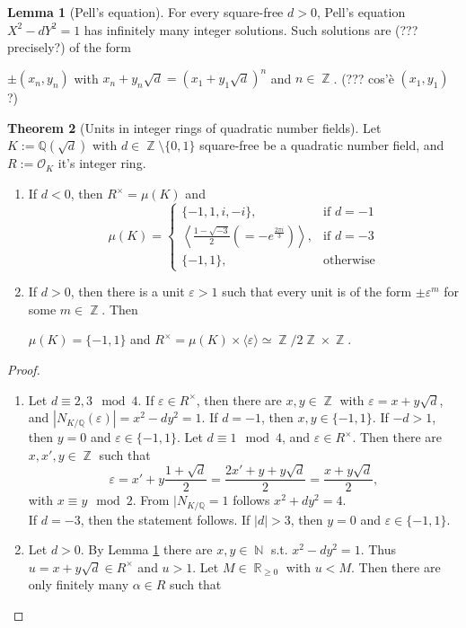 \documentclass[12pt,a4paper]{report}
\theoremstyle{definition}
\newtheorem{theorem}{Theorem}[chapter] %
\newtheorem{lemma}[theorem]{Lemma}
\theoremstyle{num.custom-title}
\DeclareMathOperator{\N}{\mathbb{N}}
\DeclareMathOperator{\R}{\mathbb{R}}
\DeclareMathOperator{\Z}{\mathbb{Z}}
\DeclareMathOperator{\sm}{\setminus}
\newcommand{\Q}{\mathbb{Q}}
\renewcommand{\epsilon}{\varepsilon}
\renewcommand{\O}{\mathcal{O}}
\begin{document}
\begin{lemma}[Pell's equation]\label{pell-eq}
For every square-free $d>0$, Pell's equation $X^2-dY^2=1$ has infinitely many integer solutions. Such solutions are (??? precisely?) of the form
\begin{center}
$\pm (x_n,y_n)$ with $x_n+y_n \sqrt{d} = (x_1+y_1 \sqrt{d})^n$ and $n \in \Z$.
(??? cos'è $(x_1,y_1)$?)
\end{center}
\end{lemma}

\begin{theorem}[Units in integer rings of quadratic number fields]
Let $K:=\Q(\sqrt{d})$ with $d \in \Z \sm \{0,1\}$ square-free be a quadratic number field, and $R:=\O_K$ it's integer ring.
\begin{enumerate}
\item If $d<0$, then $R^\times = \mu(K)$ and
\[
\mu(K) = 
\begin{cases}
\{-1,1,i,-i\}, & \text{if } d=-1 \\
\left\langle \frac{1-\sqrt{-3}}{2} (=-e^{\frac{2\pi i}{3}}) \right\rangle, & \text{if } d=-3 \\
\{-1,1\}, & \text{otherwise}
\end{cases}
\]
\item If $d>0$, then there is a unit $\epsilon>1$ such that every unit is of the form $\pm \epsilon^m$ for some $m \in \Z$. Then
\begin{center}
$\mu(K) = \{-1,1\}$ and $R^\times = \mu(K) \times \langle \epsilon \rangle \simeq \Z/2\Z \times \Z$.
\end{center}
\end{enumerate}
\begin{proof}\ 
\begin{enumerate}
\item Let $d \equiv 2,3 \mod 4$. If $\epsilon \in R^\times$, then there are $x,y \in \Z$ with $\epsilon = x+y\sqrt{d}$, and $|N_{K/\Q}(\epsilon)| = x^2-dy^2=1$. If $d=-1$, then $x,y \in \{-1,1\}$. If $-d>1$, then $y=0$ and $\epsilon \in \{-1,1\}$. Let $d \equiv 1 \mod 4$, and $\epsilon \in R^\times$. Then there are $x,x',y \in \Z$ such that
\[
\epsilon = x' + y \frac{1+\sqrt{d}}{2} = \frac{2x' + y + y\sqrt{d}}{2} = \frac{x+y\sqrt{d}}{2},
\]
with $x \equiv y \mod 2$. From $|N_{K/\Q} = 1$ follows $x^2+dy^2 = 4$.\\
If $d=-3$, then the statement follows. If $|d|>3$, then $y=0$ and $\epsilon \in \{-1,1\}$.
\item Let $d>0$. By Lemma \ref{pell-eq} there are $x,y \in \N$ s.t. $x^2-dy^2 = 1$. Thus $u = x+y\sqrt{d} \in R^\times$ and $u>1$. Let $M \in \R_{\geq 0}$ with $u<M$. Then there are only finitely many $\alpha \in R$ such that

\end{enumerate}
\end{proof}
\end{theorem}
\end{document}
